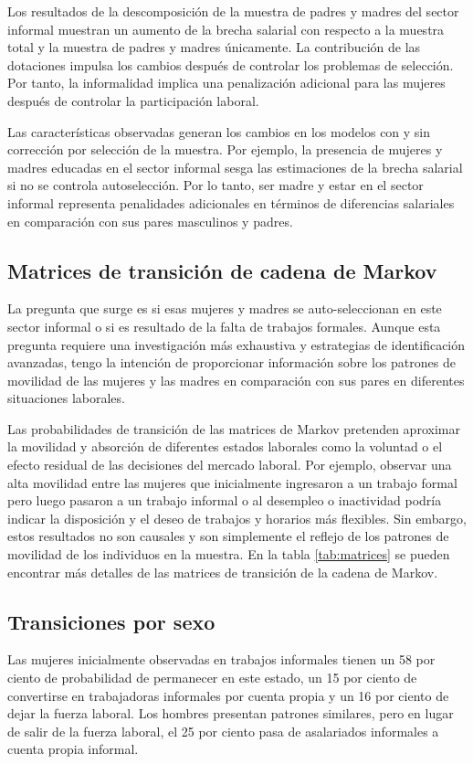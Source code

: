 %
Los resultados de la descomposición de la muestra de padres y madres del sector informal muestran un aumento de la brecha salarial con respecto a la muestra total y la muestra de padres y madres únicamente. La contribución de las dotaciones impulsa los cambios después de controlar los problemas de selección. Por tanto, la informalidad implica una penalización adicional para las mujeres después de controlar la participación laboral.

Las características observadas generan los cambios en los modelos con y sin corrección por selección de la muestra. Por ejemplo, la presencia de mujeres y madres educadas en el sector informal sesga las estimaciones de la brecha salarial si no se controla autoselección. Por lo tanto, ser madre y estar en el sector informal representa penalidades adicionales en términos de diferencias salariales en comparación con sus pares masculinos y padres.

\subsection{Matrices de transición de cadena de Markov}
La pregunta que surge es si esas mujeres y madres se auto-seleccionan en este sector informal o si es resultado de la falta de trabajos formales. Aunque esta pregunta requiere una investigación más exhaustiva y estrategias de identificación avanzadas, tengo la intención de proporcionar información sobre los patrones de movilidad de las mujeres y las madres en comparación con sus pares en diferentes situaciones laborales.

Las probabilidades de transición de las matrices de Markov pretenden aproximar la movilidad y absorción de diferentes estados laborales como la voluntad o el efecto residual de las decisiones del mercado laboral. Por ejemplo, observar una alta movilidad entre las mujeres que inicialmente ingresaron a un trabajo formal pero luego pasaron a un trabajo informal o al desempleo o inactividad podría indicar la disposición y el deseo de trabajos y horarios más flexibles. Sin embargo, estos resultados no son causales y son simplemente el reflejo de los patrones de movilidad de los individuos en la muestra. En la tabla \ref{tab:matrices} se pueden encontrar más detalles de las matrices de transición de la cadena de Markov.
\subsection{Transiciones por sexo}
Las mujeres inicialmente observadas en trabajos informales tienen un 58 por ciento de probabilidad de permanecer en este estado, un 15 por ciento de convertirse en trabajadoras informales por cuenta propia y un 16 por ciento de dejar la fuerza laboral. Los hombres presentan patrones similares, pero en lugar de salir de la fuerza laboral, el 25 por ciento pasa de asalariados informales a cuenta propia informal.

